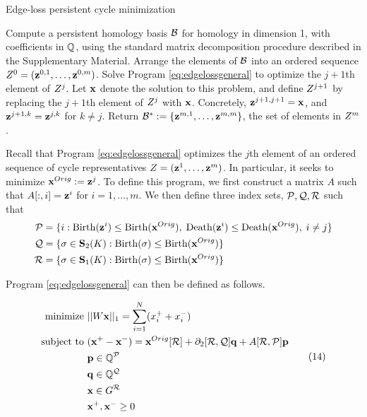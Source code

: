 \documentclass[utf8]{frontiers_suppmat} %
\begin{document}
\begin{algorithm}
\caption{Edge-loss persistent cycle minimization}
\label{alg:edge}
\begin{algorithmic}[1]
\STATE Compute a persistent homology basis $\mathcal B$ for homology in dimension 1, with coefficients in $\mathbb{Q}$,  using the standard matrix decomposition procedure described in the Supplementary Material. Arrange the elements of $\mathcal B$ into an ordered sequence $Z^0 = (\mathbf{z}^{0,1}, \ldots, \mathbf{z}^{0,m})$.
\STATE Solve Program \eqref{eq:edgelossgeneral} to optimize the $j+1$th element of $Z^{j}$.  Let $\mathbf{x}$ denote the solution to this problem, and define $Z^{j+1}$ by replacing the $j+1$th element of $Z^{j}$ with $\mathbf{x}$.  Concretely, $\mathbf{z}^{j+1,j+1} = \mathbf{x}$, and $\mathbf{z}^{j+1,k} = \mathbf{z}^{j,k}$ for $k \neq j$.
\ENDFOR
\STATE Return $\mathcal B^*: = \{\mathbf{z}^{m,1}, \ldots, \mathbf{z}^{m,m}\}$, the set of elements in $Z^m$.
\end{algorithmic}
\end{algorithm}


Recall that Program \eqref{eq:edgelossgeneral} optimizes the $j$th element of an ordered sequence of cycle representatives $Z = (\mathbf{z}^1, \ldots, \mathbf{z}^m)$.  In particular, it seeks to minimize $\mathbf{x}^{Orig} := {\mathbf z}^j$.  To define this program, we first construct a matrix $A$ such that $A[:, i] = {\mathbf z}^i$ for $i = 1, \ldots, m$.  We then define  three index sets, $\mathcal P, \mathcal Q, \mathcal R$ such that 
    \begin{align*}
        \mathcal P &= \{ i :  \mathrm{Birth}({\mathbf z}^i) \le \mathrm{Birth}(\mathbf{x}^{Orig}), \;  \mathrm{Death}({\mathbf z}^i) \le \mathrm{Death}(\mathbf{x}^{Orig}), \; i \neq j \} \\
        \mathcal Q &= \{\sigma \in \mathbf{S}_2(K) : \mathrm{Birth}(\sigma) \le \mathrm{Birth}(\mathbf{x}^{Orig})\} 
        \\
        \mathcal R &= \{\sigma \in \mathbf{S}_1(K) : \mathrm{Birth}(\sigma) \le \mathrm{Birth}(\mathbf{x}^{Orig})\}
    \end{align*} 

Program \eqref{eq:edgelossgeneral} can then be defined as follows.

\begin{align}
\begin{split}
    \text{minimize   } & ||W \mathbf{x} ||_1 = \sum_{i=1}^N  (x^+_i + x_i^-)\\
   \text{subject to  } &  
      (\mathbf{x}^+ - \mathbf{x}^- )= \mathbf{x}^{Orig}[\mathcal R] +   \partial_2[\mathcal R, \mathcal Q]  \mathbf{q} + A[\mathcal R, \mathcal P] \mathbf{p} \\
      & \mathbf{p} \in \mathbb{Q}^{\mathcal P} \\
      & \mathbf{q} \in \mathbb{Q}^{\mathcal Q} \\      
      & \mathbf{x} \in G^{\mathcal R } \\      
      & \mathbf{x}^+, \mathbf{x}^- \geq 0 
      \end{split}
      \tag{14}
      \label{eq:edgelossgeneral}
\end{align}
\end{document}
